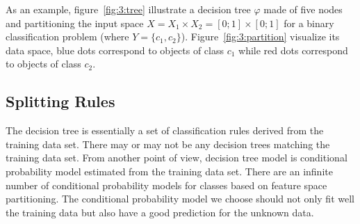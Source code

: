 \documentclass[master]{IPSstyle}
\begin{document}
{\begin{figure}[H]
\centering
{}\hspace{1cm}
\end{figure}
As an example, figure~\ref{fig:3:tree} illustrate a decision tree $\varphi$ made of five nodes and partitioning the input space $X = X_1 \times X_2 = [0; 1] \times [0; 1]$ for a binary classification problem (where $Y= \{ c_1, c_2 \}$).  Figure~\ref{fig:3:partition} visualize its data space, blue dots correspond to objects of class $c_1$ while red dots correspond to objects of class $c_2$.

\subsection{Splitting Rules}
The decision tree is essentially a set of classification rules derived from the training data set. There may or may not be any decision trees matching the training data set. From another point of view, decision tree model is conditional probability model estimated from the training data set. There are an infinite number of conditional probability models for classes based on feature space partitioning. The conditional probability model we choose should not only fit well the training data but also have a good prediction for the unknown data.

}
\end{document}
